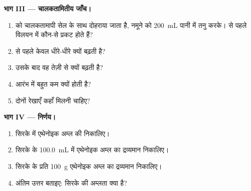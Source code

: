 \begin{problem}[{सप्ताहांत समस्या --- क्या ``6 \% अम्लता'' अंकित सिरके में
वास्तव में प्रति सौ ग्राम छह ग्राम एथेनोइक अम्ल है?}]
\medskip
\noindent\textbf{भाग III --- चालकतामितीय जाँच।}
\begin{enumerate}[resume]
  \item {} को चालकतामापी सेल के साथ दोहराया जाता है, नमूने को
        \qty{200}{mL} पानी में तनु करके।  से पहले विलयन में कौन-से 
        प्रकट होते हैं?
  \item {} से पहले  केवल धीरे-धीरे क्यों बढ़ती है?
  \item उसके बाद वह तेज़ी से क्यों बढ़ती है?
  \item आरंभ में  बहुत कम क्यों होती है?
  \item दोनों रेखाएँ कहाँ मिलनी चाहिए?
\end{enumerate}

\medskip
\noindent\textbf{भाग IV --- निर्णय।}
\begin{enumerate}[resume]
  \item सिरके में एथेनोइक अम्ल की  निकालिए।
  \item सिरके के \qty{100.0}{mL} में एथेनोइक अम्ल का द्रव्यमान निकालिए।
  \item सिरके के प्रति \qty{100}{g} एथेनोइक अम्ल का द्रव्यमान निकालिए।
  \item अंतिम उत्तर बताइए: सिरके की अम्लता क्या है?
\end{enumerate}
\end{problem}
